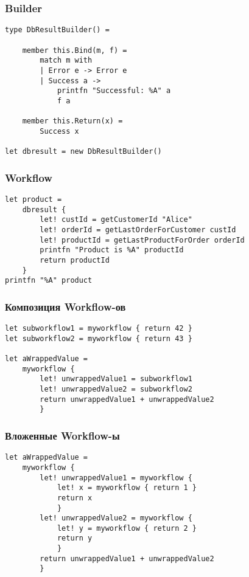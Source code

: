 \documentclass[xetex,mathserif,serif]{beamer}
\begin{document}
    \begin{frame}[fragile]
        \frametitle{Builder}
        \begin{verbatim}
type DbResultBuilder() =

    member this.Bind(m, f) = 
        match m with
        | Error e -> Error e
        | Success a -> 
            printfn "Successful: %A" a
            f a

    member this.Return(x) = 
        Success x

let dbresult = new DbResultBuilder()
        \end{verbatim}
    \end{frame}

    \begin{frame}[fragile]
        \frametitle{Workflow}
        \begin{verbatim}
let product = 
    dbresult {
        let! custId = getCustomerId "Alice"
        let! orderId = getLastOrderForCustomer custId
        let! productId = getLastProductForOrder orderId 
        printfn "Product is %A" productId
        return productId
    }
printfn "%A" product
        \end{verbatim}
    \end{frame}

    \begin{frame}[fragile]
        \frametitle{Композиция Workflow-ов}
        \begin{verbatim}
let subworkflow1 = myworkflow { return 42 }
let subworkflow2 = myworkflow { return 43 }

let aWrappedValue = 
    myworkflow {
        let! unwrappedValue1 = subworkflow1
        let! unwrappedValue2 = subworkflow2
        return unwrappedValue1 + unwrappedValue2
        }
        \end{verbatim}
    \end{frame}

    \begin{frame}[fragile]
        \frametitle{Вложенные Workflow-ы}
        \begin{verbatim}
let aWrappedValue = 
    myworkflow {
        let! unwrappedValue1 = myworkflow {
            let! x = myworkflow { return 1 }
            return x
            }
        let! unwrappedValue2 = myworkflow {
            let! y = myworkflow { return 2 }
            return y
            }
        return unwrappedValue1 + unwrappedValue2
        }
        \end{verbatim}
    \end{frame}
\end{document}
